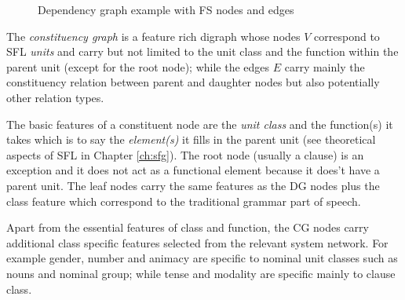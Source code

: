 \begin{figure}[H]
\centering
{}
\caption{Dependency graph example with FS nodes and edges}
\label{fig:dep-graph}
\end{figure}


\begin{definition}\label{def:constituency-graph}
	The \textit{constituency graph} is a feature rich digraph whose nodes $V$ correspond to SFL \textit{units} and carry but not limited to the unit class and the function within the parent unit (except for the root node); while the edges $E$ carry mainly the constituency relation between parent and daughter nodes but also potentially other relation types. 
\end{definition}

The basic features of a constituent node are the \textit{unit class} and the function(s) it takes which is to say the \textit{element(s)} it fills in the parent unit (see theoretical aspects of SFL in Chapter \ref{ch:sfg}). The root node (usually a clause) is an exception and it does not act as a functional element because it does't have a parent unit. The leaf nodes carry the same features as the DG nodes plus the class feature which correspond to the traditional grammar part of speech. 

Apart from the essential features of class and function, the CG nodes carry additional class specific features selected from the relevant system network. For example gender, number and animacy are specific to nominal unit classes such as nouns and nominal group; while tense and modality are specific mainly to clause class.

